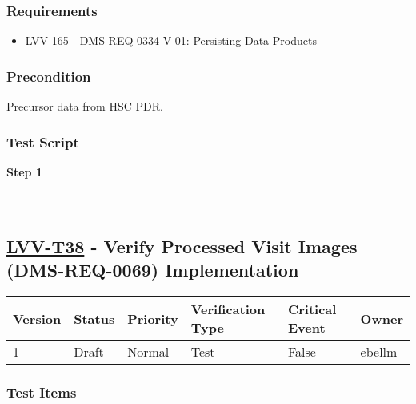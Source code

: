 \hypertarget{requirements-51}{%
\subsubsection{Requirements}\label{requirements-51}}

\begin{itemize}
\tightlist
\item
  \href{https://jira.lsstcorp.org/browse/LVV-165}{LVV-165} -
  DMS-REQ-0334-V-01: Persisting Data Products
\end{itemize}

\hypertarget{precondition-4}{%
\subsubsection{Precondition}\label{precondition-4}}

Precursor data from HSC PDR.

\hypertarget{test-script-25}{%
\subsubsection{Test Script}\label{test-script-25}}

\textbf{Step 1}\\
~\\
~\\

\hypertarget{lvv-t38---verify-processed-visit-images-dms-req-0069-implementation}{%
\subsection{\texorpdfstring{\href{https://jira.lsstcorp.org/secure/Tests.jspa\#/testCase/LVV-T38}{LVV-T38}
- Verify Processed Visit Images (DMS-REQ-0069)
Implementation}{LVV-T38 - Verify Processed Visit Images (DMS-REQ-0069) Implementation}}\label{lvv-t38---verify-processed-visit-images-dms-req-0069-implementation}}

\begin{longtable}[]{@{}llllll@{}}
\toprule
Version & Status & Priority & Verification Type & Critical Event &
Owner\tabularnewline
\midrule
\endhead
1 & Draft & Normal & Test & False & ebellm\tabularnewline
\bottomrule
\end{longtable}

\hypertarget{test-items-26}{%
\subsubsection{Test Items}\label{test-items-26}}

